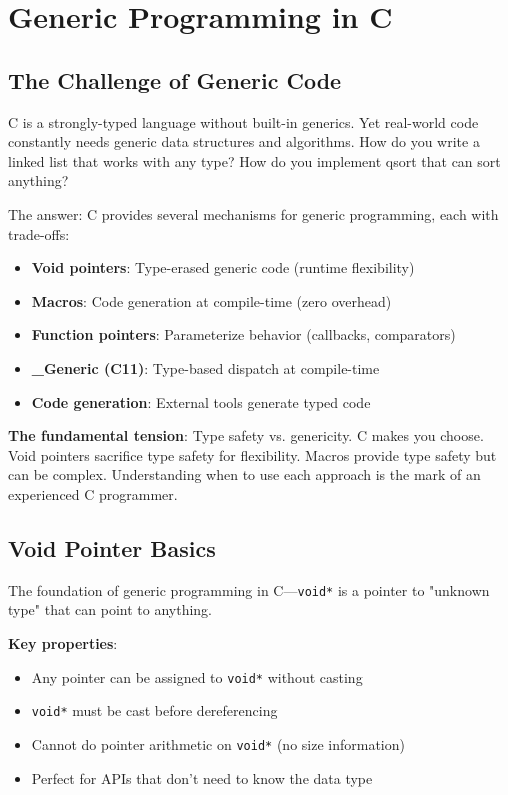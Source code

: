 \chapter{Generic Programming in C}

\section{The Challenge of Generic Code}

C is a strongly-typed language without built-in generics. Yet real-world code constantly needs generic data structures and algorithms. How do you write a linked list that works with any type? How do you implement qsort that can sort anything?

The answer: C provides several mechanisms for generic programming, each with trade-offs:

\begin{itemize}
    \item \textbf{Void pointers}: Type-erased generic code (runtime flexibility)
    \item \textbf{Macros}: Code generation at compile-time (zero overhead)
    \item \textbf{Function pointers}: Parameterize behavior (callbacks, comparators)
    \item \textbf{\_Generic (C11)}: Type-based dispatch at compile-time
    \item \textbf{Code generation}: External tools generate typed code
\end{itemize}

\textbf{The fundamental tension}: Type safety vs. genericity. C makes you choose. Void pointers sacrifice type safety for flexibility. Macros provide type safety but can be complex. Understanding when to use each approach is the mark of an experienced C programmer.

\section{Void Pointer Basics}

The foundation of generic programming in C—\texttt{void*} is a pointer to "unknown type" that can point to anything.

\textbf{Key properties}:
\begin{itemize}
    \item Any pointer can be assigned to \texttt{void*} without casting
    \item \texttt{void*} must be cast before dereferencing
    \item Cannot do pointer arithmetic on \texttt{void*} (no size information)
    \item Perfect for APIs that don't need to know the data type
\end{itemize}

